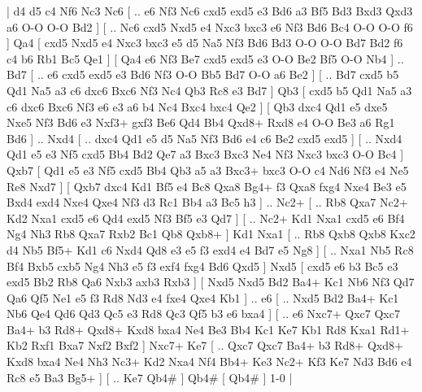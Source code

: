 \makegametitle 
|   d4   d5    c4   Nf6    Nc3   Nc6 [ .. e6  Nf3 Nc6  cxd5 exd5  e3 Bd6  a3 Bf5  Bd3 Bxd3  Qxd3 a6  O-O O-O  Bd2   ]  [ .. Nc6  cxd5 Nxd5  e4 Nxc3  bxc3 e6  Nf3 Bd6  Bc4 O-O  O-O f6   ]  Qa4 [  cxd5 Nxd5  e4 Nxc3  bxc3 e5  d5 Na5  Nf3 Bd6  Bd3 O-O  O-O Bd7  Bd2 f6  c4 b6  Rb1 Bc5  Qe1   ]  [  Qa4 e6  Nf3 Be7  cxd5 exd5  e3 O-O  Be2 Bf5  O-O Nb4   ] .. Bd7 [ .. e6  cxd5 exd5  e3 Bd6  Nf3 O-O  Bb5 Bd7  O-O a6  Be2   ]  [ .. Bd7  cxd5 b5  Qd1 Na5  a3 c6  dxc6 Bxc6  Nf3 Nc4  Qb3 Rc8  e3 Bd7   ]  Qb3 [  cxd5 b5  Qd1 Na5  a3 c6  dxc6 Bxc6  Nf3 e6  e3 a6  b4 Nc4  Bxc4 bxc4  Qe2   ]  [  Qb3 dxc4  Qd1 e5  dxe5 Nxe5  Nf3 Bd6  e3 Nxf3+  gxf3 Be6  Qd4 Bb4  Qxd8+ Rxd8  e4 O-O  Be3 a6  Rg1 Bd6   ] .. Nxd4 [ .. dxc4  Qd1 e5  d5 Na5  Nf3 Bd6  e4 c6  Be2 cxd5  exd5   ]  [ .. Nxd4  Qd1 e5  e3 Nf5  cxd5 Bb4  Bd2 Qe7  a3 Bxc3  Bxc3 Ne4  Nf3 Nxc3  bxc3 O-O  Bc4   ]  Qxb7 [  Qd1 e5  e3 Nf5  cxd5 Bb4  Qb3 a5  a3 Bxc3+  bxc3 O-O  c4 Nd6  Nf3 e4  Ne5 Re8  Nxd7   ]  [  Qxb7 dxc4  Kd1 Bf5  e4 Bc8  Qxa8 Bg4+  f3 Qxa8  fxg4 Nxe4  Be3 e5  Bxd4 exd4  Nxe4 Qxe4  Nf3 d3  Rc1 Bb4  a3 Bc5  h3   ] .. Nc2+ [ .. Rb8  Qxa7 Nc2+  Kd2 Nxa1  cxd5 e6  Qd4 exd5  Nf3 Bf5  e3 Qd7   ]  [ .. Nc2+  Kd1 Nxa1  cxd5 e6  Bf4 Ng4  Nh3 Rb8  Qxa7 Rxb2  Bc1 Qb8  Qxb8+   ]  Kd1   Nxa1 [ .. Rb8  Qxb8 Qxb8  Kxc2 d4  Nb5 Bf5+  Kd1 c6  Nxd4 Qd8  e3 e5  f3 exd4  e4 Bd7  e5 Ng8   ]  [ .. Nxa1  Nb5 Rc8  Bf4 Bxb5  cxb5 Ng4  Nh3 e5  f3 exf4  fxg4 Bd6  Qxd5   ]  Nxd5 [  cxd5 e6  b3 Bc5  e3 exd5  Bb2 Rb8  Qa6 Nxb3  axb3 Rxb3   ]  [  Nxd5 Nxd5  Bd2 Ba4+  Kc1 Nb6  Nf3 Qd7  Qa6 Qf5  Ne1 e5  f3 Rd8  Nd3 e4  fxe4 Qxe4  Kb1   ] .. e6 [ .. Nxd5  Bd2 Ba4+  Kc1 Nb6  Qe4 Qd6  Qd3 Qc5  e3 Rd8  Qc3 Qf5  b3 e6  bxa4   ]  [ .. e6  Nxc7+ Qxc7  Qxc7 Ba4+  b3 Rd8+  Qxd8+ Kxd8  bxa4 Ne4  Be3 Bb4  Kc1 Ke7  Kb1 Rd8  Kxa1 Rd1+  Kb2 Rxf1  Bxa7 Nxf2  Bxf2   ]  Nxc7+   Ke7    [ .. Qxc7  Qxc7 Ba4+  b3 Rd8+  Qxd8+ Kxd8  bxa4 Ne4  Nh3 Nc3+  Kd2 Nxa4  Nf4 Bb4+  Ke3 Nc2+  Kf3 Ke7  Nd3 Bd6  e4 Rc8  e5 Ba3  Bg5+   ]  [ .. Ke7  Qb4#   ]  Qb4#    [  Qb4#   ] 1-0  |
